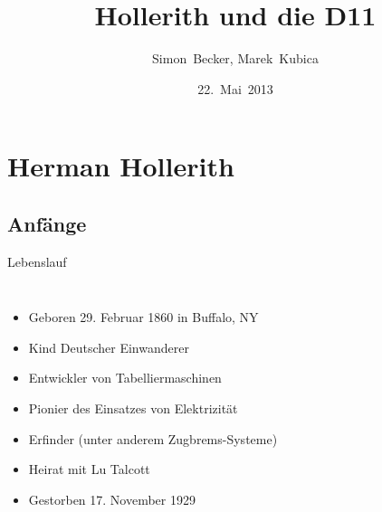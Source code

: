 \documentclass[EU2]{beamer}
\title{Hollerith und die D11}
\author{Simon~Becker, Marek~Kubica}
\date{22.~Mai~2013}
\institute{Technische Universität München}
\begin{document}
\frame{\titlepage}


\frame{\tableofcontents}

\section{Herman Hollerith}

\subsection{Anfänge}

\begin{frame}{Lebenslauf}
  \begin{columns}
    \begin{itemize}
      \item Geboren 29. Februar 1860 in Buffalo, NY
      \item Kind Deutscher Einwanderer
      \item Entwickler von Tabelliermaschinen
      \item Pionier des Einsatzes von Elektrizität
      \item Erfinder (unter anderem Zugbrems-Systeme)
      \item Heirat mit Lu Talcott
      \item Gestorben 17. November 1929
    \end{itemize}

\end{columns}
\end{frame}
\end{document}
